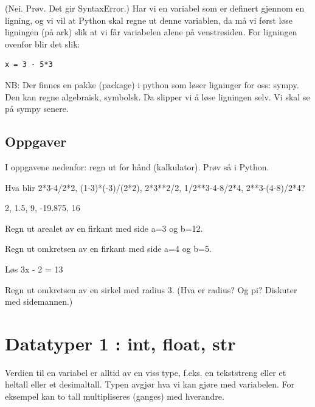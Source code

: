 (Nei. Prøv. Det gir SyntaxError.) Har vi en variabel som er definert gjennom en ligning, og vi vil at Python skal regne ut denne variablen, da må vi først løse ligningen (på ark) slik at vi får variabelen alene på venstresiden. For ligningen ovenfor blir det slik: 

\begin{lstlisting}
x = 3 - 5*3
\end{lstlisting}

NB: Der finnes en pakke (package) i python som løser ligninger for oss: sympy. Den kan regne algebraisk, symbolsk. Da slipper vi å løse ligningen selv. Vi skal se på sympy senere. 

\subsection{Oppgaver}

I oppgavene nedenfor: regn ut for hånd (kalkulator). Prøv så i Python. 

\begin{exercise}
Hva blir 2*3-4/2*2, (1-3)*(-3)/(2*2), 2*3**2/2, 1/2**3-4-8/2*4, 2**3-(4-8)/2*4?  
\end{exercise}
\begin{solution}
2, 1.5, 9, -19.875, 16
\end{solution}

\begin{exercise}
Regn ut arealet av en firkant med side a=3 og b=12.
\end{exercise}

\begin{exercise}
Regn ut omkretsen av en firkant med side a=4 og b=5.
\end{exercise}

\begin{exercise}
Løs 3x - 2 = 13 
\end{exercise}

\begin{exercise}
Regn ut omkretsen av en sirkel med radius 3. (Hva er radius? Og pi? Diskuter med sidemannen.)
\end{exercise}

\section{Datatyper 1 : int, float, str}

Verdien til en variabel er alltid av en viss type, f.eks. en tekststreng eller et heltall eller et desimaltall. Typen avgjør hva vi kan gjøre med variabelen. For eksempel kan to tall multipliseres (ganges) med hverandre.

